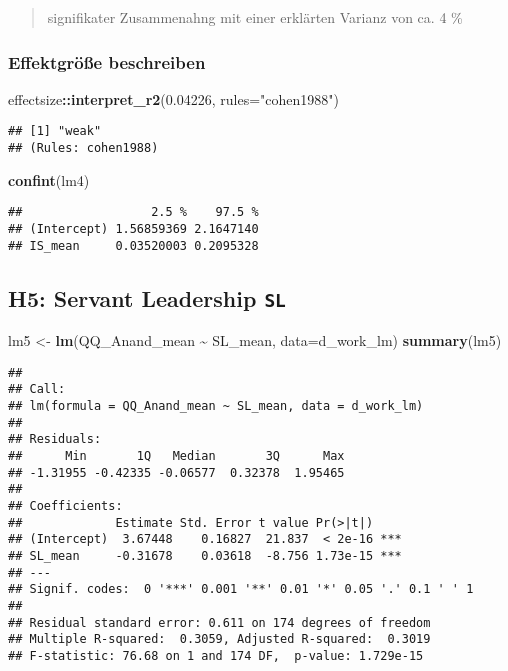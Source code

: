 \documentclass[
]{article}
\newenvironment{Shaded}{\begin{snugshade}}{\end{snugshade}}
\newcommand{\AttributeTok}[1]{\textcolor[rgb]{0.13,0.29,0.53}{#1}}
\newcommand{\FloatTok}[1]{\textcolor[rgb]{0.00,0.00,0.81}{#1}}
\newcommand{\FunctionTok}[1]{\textcolor[rgb]{0.13,0.29,0.53}{\textbf{#1}}}
\newcommand{\NormalTok}[1]{#1}
\newcommand{\OtherTok}[1]{\textcolor[rgb]{0.56,0.35,0.01}{#1}}
\newcommand{\SpecialCharTok}[1]{\textcolor[rgb]{0.81,0.36,0.00}{\textbf{#1}}}
\newcommand{\StringTok}[1]{\textcolor[rgb]{0.31,0.60,0.02}{#1}}
\begin{document}
\begin{quote}
signifikater Zusammenahng mit einer erklärten Varianz von ca. 4 \%
\end{quote}

\subsubsection{Effektgröße
beschreiben}\label{effektgruxf6uxdfe-beschreiben-3}

\begin{Shaded}
\begin{Highlighting}[]
\NormalTok{effectsize}\SpecialCharTok{::}\FunctionTok{interpret\_r2}\NormalTok{(}\FloatTok{0.04226}\NormalTok{, }\AttributeTok{rules=}\StringTok{"cohen1988"}\NormalTok{)}
\end{Highlighting}
\end{Shaded}

\begin{verbatim}
## [1] "weak"
## (Rules: cohen1988)
\end{verbatim}

\begin{Shaded}
\begin{Highlighting}[]
\FunctionTok{confint}\NormalTok{(lm4)}
\end{Highlighting}
\end{Shaded}

\begin{verbatim}
##                  2.5 %    97.5 %
## (Intercept) 1.56859369 2.1647140
## IS_mean     0.03520003 0.2095328
\end{verbatim}

\subsection{\texorpdfstring{H5: Servant Leadership
\texttt{SL}}{H5: Servant Leadership SL}}\label{h5-servant-leadership-sl}

\begin{Shaded}
\begin{Highlighting}[]
\NormalTok{lm5 }\OtherTok{\textless{}{-}} \FunctionTok{lm}\NormalTok{(QQ\_Anand\_mean }\SpecialCharTok{\textasciitilde{}}\NormalTok{ SL\_mean, }\AttributeTok{data=}\NormalTok{d\_work\_lm)}
\FunctionTok{summary}\NormalTok{(lm5)}
\end{Highlighting}
\end{Shaded}

\begin{verbatim}
## 
## Call:
## lm(formula = QQ_Anand_mean ~ SL_mean, data = d_work_lm)
## 
## Residuals:
##      Min       1Q   Median       3Q      Max 
## -1.31955 -0.42335 -0.06577  0.32378  1.95465 
## 
## Coefficients:
##             Estimate Std. Error t value Pr(>|t|)    
## (Intercept)  3.67448    0.16827  21.837  < 2e-16 ***
## SL_mean     -0.31678    0.03618  -8.756 1.73e-15 ***
## ---
## Signif. codes:  0 '***' 0.001 '**' 0.01 '*' 0.05 '.' 0.1 ' ' 1
## 
## Residual standard error: 0.611 on 174 degrees of freedom
## Multiple R-squared:  0.3059, Adjusted R-squared:  0.3019 
## F-statistic: 76.68 on 1 and 174 DF,  p-value: 1.729e-15
\end{verbatim}
\end{document}
